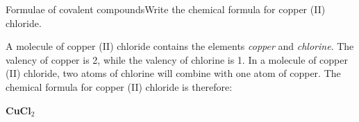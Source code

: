 \begin{wex}{Formulae of covalent compounds}{Write the chemical formula for copper (II) chloride.\\}

{
A molecule of copper (II) chloride contains the elements \textit{copper} and \textit{chlorine}.  
The valency of copper is 2, while 
the valency of chlorine is 1. In a molecule of copper (II) chloride, two atoms of chlorine will combine with one atom of copper.
The chemical formula for copper (II) chloride is therefore: 

\begin{center}
\textbf{CuCl$_{2}$}
\end{center}}
\end{wex}
    \noindent
      \label{m38689*uid98}
